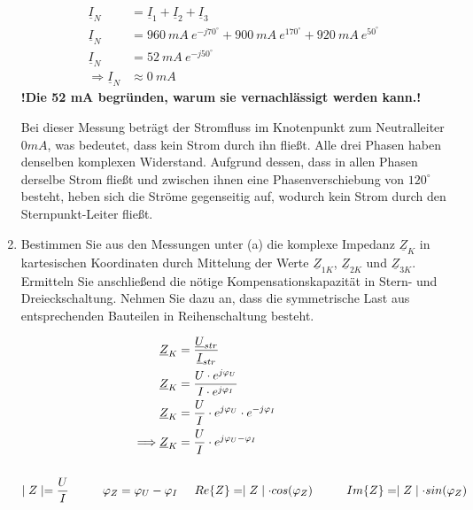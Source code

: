 \begin{enumerate}[label=\alph*)]
	 		\begin{align*}
	 			\underline{I}_{N} &= \underline{I}_{1}+\underline{I}_{2}+\underline{I}_{3} \\
	 			\underline{I}_{N} &= 960\ mA\ e^{-j70^\circ} + 900\ mA\ e^{170^\circ} + 920\ mA\ e^{50^\circ} \\
	 			\underline{I}_{N} &= 52\ mA\ e^{-j50^\circ} \\
 				\Longrightarrow\underline{I}_{N} &\approx 0\ mA
	 		\end{align*}
	 		\textbf{!Die 52 mA begründen, warum sie vernachlässigt werden kann.!}
	 		
	 		Bei dieser Messung beträgt der Stromfluss im Knotenpunkt zum Neutralleiter $0 mA$, was bedeutet, dass kein Strom durch ihn fließt. Alle drei Phasen haben denselben komplexen Widerstand. Aufgrund dessen, dass in allen Phasen derselbe Strom fließt und zwischen ihnen eine Phasenverschiebung von $120^\circ$ besteht, heben sich die Ströme gegenseitig auf, wodurch kein Strom durch den Sternpunkt-Leiter fließt.
	 		
	 		\item Bestimmen Sie aus den Messungen unter (a) die komplexe Impedanz $\underline{Z}_{K}$ in kartesischen Koordinaten durch Mittelung der Werte $\underline{Z}_{1K}$, $\underline{Z}_{2K}$ und $\underline{Z}_{3K}$. Ermitteln Sie anschließend die nötige Kompensationskapazität in Stern- und Dreieckschaltung. Nehmen Sie dazu an, dass die symmetrische Last aus entsprechenden Bauteilen in Reihenschaltung besteht.
	 		
	 		\begin{align*}
	 			\underline{Z}_{K} &= \frac{\underline{U}_{str}}{\underline{I}_{str}}\\
	 			\underline{Z}_{K} &= \frac{U\cdot  e^{j\varphi _{U}}}{I\cdot  e^{j\varphi _{I}}}\\
	 			\underline{Z}_{K} &= \frac{U}{I} \cdot  e^{j\varphi _{U}}\cdot e^{-j\varphi _{I}}\\
	 			\Longrightarrow\underline{Z}_{K} &= \frac{U}{I} \cdot  e^{j{\varphi _{U} - \varphi _{I}}} \\ \ \\
	 			\mid Z \mid			= \frac{U}{I} \hspace{1cm}
	 			\varphi _{Z} 		= {\varphi _{U} - \varphi _{I}}
	 			&\hspace{0.5cm}
	 			Re\{Z\} 			= \mid Z \mid \cdot cos(\varphi _{Z}) \hspace{1cm}
	 			Im\{Z\} 			= \mid Z \mid \cdot sin(\varphi _{Z})\\
	 		\end{align*}
	 		

\end{enumerate}
